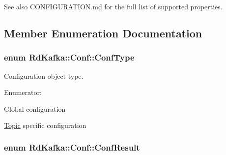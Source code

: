 \begin{DoxySeeAlso}{See also}
CONFIGURATION.md for the full list of supported properties. 
\end{DoxySeeAlso}


\subsection{Member Enumeration Documentation}
\hypertarget{classRdKafka_1_1Conf_a118f3a1435b5379ec999daac9d84f001}{
\subsubsection[{ConfType}]{\setlength{\rightskip}{0pt plus 5cm}enum {\bf RdKafka::Conf::ConfType}}}
\label{classRdKafka_1_1Conf_a118f3a1435b5379ec999daac9d84f001}


Configuration object type. \begin{Desc}
\item[Enumerator: ]\par
\begin{description}
\item[{\em 
\hypertarget{classRdKafka_1_1Conf_a118f3a1435b5379ec999daac9d84f001a4e81d66df545d825efcfbd2c279f8d05}{
CONF\_\-GLOBAL}
\label{classRdKafka_1_1Conf_a118f3a1435b5379ec999daac9d84f001a4e81d66df545d825efcfbd2c279f8d05}
}]Global configuration \item[{\em 
\hypertarget{classRdKafka_1_1Conf_a118f3a1435b5379ec999daac9d84f001a7b0aad93bf57f0274f0d9632af238388}{
CONF\_\-TOPIC}
\label{classRdKafka_1_1Conf_a118f3a1435b5379ec999daac9d84f001a7b0aad93bf57f0274f0d9632af238388}
}]\hyperlink{classRdKafka_1_1Topic}{Topic} specific configuration \end{description}
\end{Desc}

\hypertarget{classRdKafka_1_1Conf_a1d023a689c09f42ab18b7bd1d15a11a6}{
\subsubsection[{ConfResult}]{\setlength{\rightskip}{0pt plus 5cm}enum {\bf RdKafka::Conf::ConfResult}}}
\label{classRdKafka_1_1Conf_a1d023a689c09f42ab18b7bd1d15a11a6}


